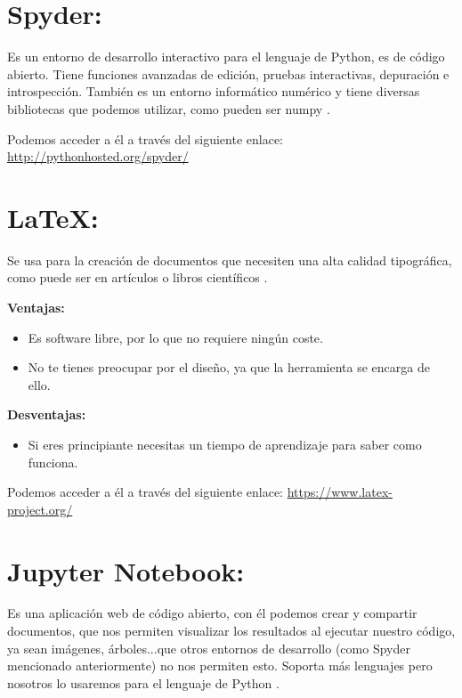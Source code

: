 \section{Spyder:}
Es un entorno de desarrollo interactivo para el lenguaje de Python, es de código abierto.
Tiene funciones avanzadas de edición, pruebas interactivas, depuración e introspección. También es un entorno informático numérico y tiene diversas bibliotecas que podemos utilizar, como pueden ser numpy \cite{spyder}.

Podemos acceder a él a través del siguiente enlace: 
\url{http://pythonhosted.org/spyder/}

\section{\LaTeX:}
Se usa para la creación de documentos que necesiten una alta calidad tipográfica, como puede ser en artículos o libros científicos \cite{latex}.

\textbf{Ventajas:}

\begin{itemize}
\item Es software libre, por lo que no requiere ningún coste.

\item No te tienes preocupar por el diseño, ya que la herramienta se encarga de ello.

\end{itemize}

\textbf{Desventajas:}

\begin{itemize}
\item Si eres principiante necesitas un tiempo de aprendizaje para saber como funciona.
\end{itemize}

Podemos acceder a él a través del siguiente enlace: 
\url{https://www.latex-project.org/}

\section{Jupyter Notebook:}
Es una aplicación web de código abierto, con él podemos crear y compartir documentos, que nos permiten visualizar los resultados al ejecutar nuestro código, ya sean imágenes, árboles...que otros entornos de desarrollo (como Spyder mencionado anteriormente) no nos permiten esto.
Soporta más lenguajes pero nosotros lo usaremos para el lenguaje de Python \cite{jupyter}.

